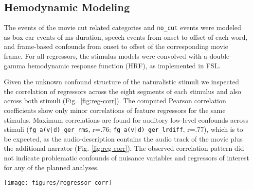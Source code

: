 \documentclass[english]{article}
\begin{document}
\subsection{Hemodynamic Modeling}

The events of the movie cut related categories and \texttt{no\_cut} events were
modeled as box car events of \unit[200]{ms} duration,
%
speech events from onset to offset of each word, and frame-based confounds from
onset to offset of the corresponding movie frame.
For all regressors, the stimulus models were convolved with a double-gamma
hemodynamic response function (HRF), as implemented in FSL.

Given the unknown confound structure of the naturalistic stimuli we inspected
the correlation of regressors across the eight segments of each stimulus and
also across both stimuli (Fig.~\ref{fig:reg-corr}).
The computed Pearson correlation coefficients show only minor correlations of
feature regressors for the same stimulus.
Maximum correlations are found for auditory low-level confounds across stimuli
(\texttt{fg\_a(v|d)\_ger\_rms}, r=.76;
\texttt{fg\_a(v|d)\_ger\_lrdiff}, r=.77),
which is to be expected, as the audio-description contains the audio track of
the movie plus the additional narrator (Fig. \ref{fig:reg-corr}).
The observed correlation pattern did not indicate problematic confounds of
nuisance variables and regressors of interest for any of the planned
analyses.


\begin{figure*}[tbp]
\centering
    \texttt{[image: figures/regressor-corr]} \caption{Pearson
        correlation coefficients of modeled time series used as regressors in
        the GLM analysis of the
        audio-description (blue; Tab.~\ref{tab:ao-events} for a
        description) and audio-visual movie (red; Tab.~\ref{tab:av-events}).
        Values are rounded to the nearest tenth.
        The correlation between the two stimuli's
        root mean square volume and between their left-right difference in
        volume yielded the highest correlation values
        (\texttt{fg\_ad\_rms} and \texttt{fg\_av\_ger\_rms}, r=.7635;
        \texttt{fg\_ad\_lrdiff} and \texttt{fg\_av\_ger\_lrdiff}, r=.7749).
      }
\label{fig:reg-corr}
\end{figure*}
\end{document}
